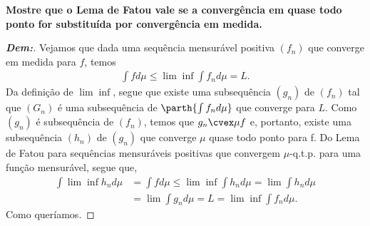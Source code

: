 \textbf{Mostre que o Lema de Fatou vale se a convergência em quase todo ponto for 
substituída por convergência em medida.}
\begin{proof}[\textbf{Dem:}]Vejamos que dada uma sequência mensurável positiva 
  $(f_n)$ que converge em medida para $f$, temos
  \begin{align*}
    \int f d\mu \le \lim\inf \int f_n d\mu = L.
  \end{align*}
  Da definição de $\lim\inf$, segue que existe uma subsequência $(g_n)$
  de $(f_n)$ tal que $(G_n)$ é uma subsequência de $\parth{\int f_n d\mu}$
  que converge para $L$. Como $(g_n)$ é subsequência de $(f_n)$, temos que 
  $g_n \cvex \mu f$ e, portanto, existe uma subsequência $(h_n)$ de $(g_n)$
  que converge $\mu$ quase todo ponto para f. Do Lema de Fatou para 
  sequências mensuráveis positivas que convergem $\mu$-q.t.p. para uma 
  função mensurável, segue que, 
  \begin{align*}
    \int \lim \inf h_n d\mu &= \int f d\mu \le \lim \inf \int h_n d\mu 
    = \lim \int h_n d\mu \\
    &=  \lim \int g_n d\mu= L = \lim \inf \int f_n d\mu.
  \end{align*}
  Como queríamos.
\end{proof}

